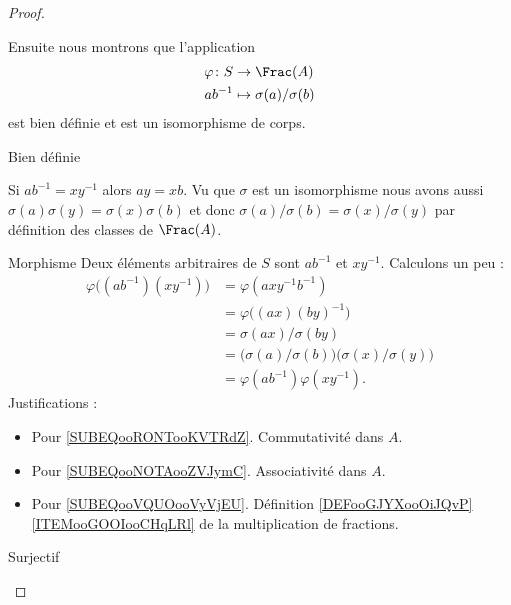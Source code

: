 \begin{proof}
\begin{subproof}
    Ensuite nous montrons que l'application
    \begin{equation}
        \begin{aligned}
            \varphi\colon S&\to \Frac(A) \\
            ab^{-1}&\mapsto \sigma(a)/\sigma(b)
        \end{aligned}
    \end{equation}
    est bien définie et est un isomorphisme de corps.

        \item[Bien définie]

            Si \( ab^{-1}=xy^{-1}\) alors \( ay=xb\). Vu que \( \sigma\) est un isomorphisme nous avons aussi \( \sigma(a)\sigma(y)=\sigma(x)\sigma(b)\) et donc \( \sigma(a)/\sigma(b)=\sigma(x)/\sigma(y)\) par définition des classes de \( \Frac(A)\).
        \item[Morphisme]
            Deux éléments arbitraires de \( S\) sont \( ab^{-1}\) et \( xy^{-1}\). Calculons un peu :
            \begin{subequations}
                \begin{align}
                    \varphi\big( (ab^{-1})(xy^{-1}) \big)&=\varphi(axy^{-1}b^{-1})      \label{SUBEQooRONTooKVTRdZ}\\
                    &=\varphi\big( (ax)(by)^{-1} \big)      \label{SUBEQooNOTAooZVJymC}\\
                    &=\sigma(ax)/\sigma(by)\\
                    &=\big(\sigma(a)/\sigma(b)\big)\big(\sigma(x)/\sigma(y)\big)            \label{SUBEQooVQUOooVyVjEU} \\
                    &=\varphi(ab^{-1})\varphi(xy^{-1}).
                \end{align}
            \end{subequations}
            Justifications :
            \begin{itemize}
                \item Pour \eqref{SUBEQooRONTooKVTRdZ}. Commutativité dans \( A\).
                \item Pour \eqref{SUBEQooNOTAooZVJymC}. Associativité dans \( A\).
                \item Pour \eqref{SUBEQooVQUOooVyVjEU}. Définition \ref{DEFooGJYXooOiJQvP}\ref{ITEMooGOOIooCHqLRl} de la multiplication de fractions.
            \end{itemize}


        \item[Surjectif]


\end{subproof}
\end{proof}
